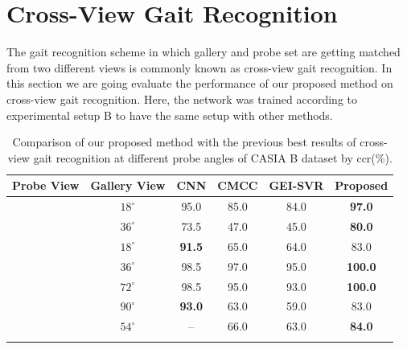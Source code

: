 \section{Cross-View Gait Recognition} \label{sec:cross_view}
The gait recognition scheme in which gallery and probe set are getting matched from two different views is commonly known as cross-view gait recognition. In this section we are going evaluate the performance of our proposed method on cross-view gait recognition. Here, the network was trained according to experimental setup B to have the same setup with other methods.
 

\begin{table}
	\centering
	\caption[Comparison of our proposed method with the previous best results of cross-view gait recognition ]
	{Comparison of our proposed method with the previous best results of cross-view gait recognition at different probe angles of CASIA B dataset by \gls{ccr}(\%).  \label{table:comp_casia_b_cross_view}}
	
	{\begin{tabular*}{29pc}{cccccc}\hline  \rule{0pt}{2ex}
	Probe View &Gallery View &CNN &CMCC &GEI-SVR  &\textbf{Proposed} \\ \hline\rule{0pt}{3ex}
	
	\multirow{2}{*}{$0^{\circ}$} &$18^{\circ}$ &95.0 &85.0 &84.0 &\textbf{97.0} \\\rule{0pt}{2ex}
	
					&$36^{\circ}$ &73.5 &47.0 &45.0 &\textbf{80.0} \\ \hline\rule{0pt}{3ex}
	
	
	\multirow{4}{*}{$54^{\circ}$} &$18^{\circ}$ &\textbf{91.5} &65.0 &64.0  &83.0 \\\rule{0pt}{2ex}
	
			&$36^{\circ}$ &98.5 &97.0 &95.0 &\textbf{100.0} \\\rule{0pt}{2ex}
	
			&$72^{\circ}$ &98.5 &95.0 &93.0 &\textbf{100.0} \\\rule{0pt}{2ex}
	
			&$90^{\circ}$ &\textbf{93.0} &63.0 &59.0 &83.0 \\\hline\rule{0pt}{3ex}
	
	
	\multirow{4}{*}{$90^{\circ}$} &$54^{\circ}$ &-- &66.0 &63.0 &\textbf{84.0 }\\\rule{0pt}{2ex}
	

\end{tabular*}}
\end{table}
